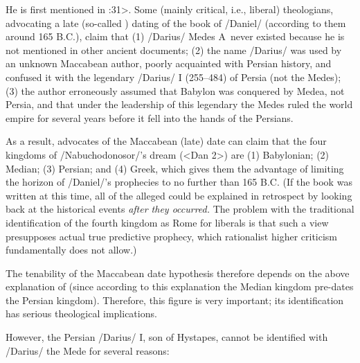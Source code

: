 
He is first mentioned in :31>. Some (mainly critical, i.e., liberal) theologians, advocating a late (so-called ) dating of the book of \x/Daniel/ (according to them around 165 B.C.), claim that
(1) \x/Darius/ Medes 
\insertCite A\left\
never existed because he is not mentioned in other ancient documents; (2) the name \x/Darius/ was used by an unknown Maccabean author, poorly acquainted with Persian
history, and confused it with the legendary \x/Darius/ I (255--484) of Persia (not the Medes); (3) the author erroneously assumed that Babylon was conquered by Medea, not Persia, and that under the leadership of this
legendary \uv{\x/Darius/} the Medes ruled the world empire for several years before it fell into the hands of the Persians.

As a result, advocates of the Maccabean (late) date can claim that the four kingdoms of \x/Nabuchodonosor/'s dream (<Dan 2>) are (1) Babylonian; (2) Median; (3) Persian; and (4) Greek, which
gives them the advantage of limiting the horizon of \x/Daniel/'s prophecies to no further than 165 B.C. (If the book was written at this time, all of the alleged \uv{prophecies} could be explained in retrospect by looking back at the historical events {\it after they occurred.\/} The problem with the traditional identification of the fourth kingdom as Rome for liberals is that such a view presupposes actual true predictive prophecy, which rationalist higher criticism fundamentally does not allow.)

The tenability of the Maccabean date hypothesis therefore depends on the above explanation of  (since according to this explanation the Median kingdom pre-dates the Persian kingdom).
Therefore, this figure is very important; its identification has serious theological implications.

However, the Persian \x/Darius/ I, son of Hystapes, cannot be identified with \x/Darius/ the Mede for several reasons:




